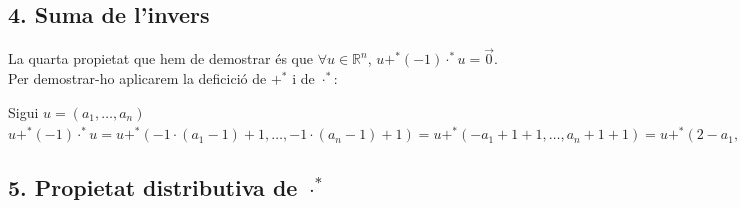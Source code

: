 \documentclass[a4paper, 9pt]{article}
\begin{document}
    \subsection*{4. Suma de l'invers}
        La quarta propietat que hem de demostrar \'es que ${\forall u \in \mathbb{R}^n}$, ${u +^* (-1)\cdot^*u = \vec{0}}$. Per demostrar-ho aplicarem la deficici\'o de ${+^*}$ i de ${\cdot^*}$:
        \begin{center}
            Sigui ${u = (a_1,\dots,a_n)}$ \\
            \begin{math}
                u+^*(-1)\cdot^*u = u +^* (-1\cdot(a_1-1)+1,\dots,-1\cdot(a_n-1)+1) = u +^* (-a_1+1+1,\dots,a_n+1+1) = u +^* (2-a_1,\dots,2-a_n) = (a_1+(2-a_1)-1,\dots,a_n+(2-a_n)-1) = (1,\dots,1) = \vec{0}
            \end{math}
        \end{center}

    \subsection*{5. Propietat distributiva de ${\cdot^*}$}
        
\end{document}
